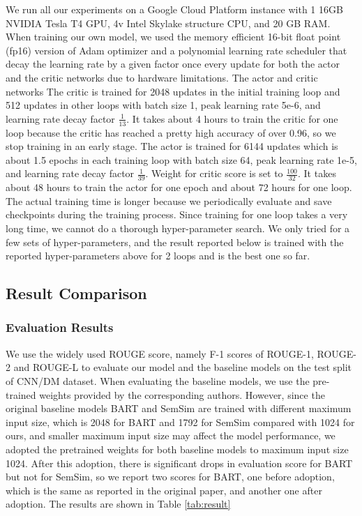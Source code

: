 \documentclass[11pt,a4paper]{article}
\begin{document}
We run all our experiments on a Google Cloud Platform instance with 1 16GB NVIDIA Tesla T4 GPU, 4v Intel Skylake structure CPU, and 20 GB RAM. When training our own model, we used the memory efficient 16-bit float point (fp16) version of Adam optimizer and a polynomial learning rate scheduler that decay the learning rate by a given factor once every update for both the actor and the critic networks due to hardware limitations. The actor and critic networks  The critic is trained for 2048 updates in the initial training loop and 512 updates in other loops with batch size 1, peak learning rate 5e-6, and learning rate decay factor $\frac{1}{13}$. It takes about 4 hours to train the critic for one loop because the critic has reached a pretty high accuracy of over 0.96, so we stop training in an early stage. The actor is trained for 6144 updates which is about 1.5 epochs in each training loop with batch size 64, peak learning rate 1e-5, and learning rate decay factor $\frac{1}{39}$. Weight for critic score is set to $\frac{100}{32}$. It takes about 48 hours to train the actor for one epoch and about 72 hours for one loop. The actual training time is longer because we periodically evaluate and save checkpoints during the training process. Since training for one loop takes a very long time, we cannot do a thorough hyper-parameter search. We only tried for a few sets of hyper-parameters, and the result reported below is trained with the reported hyper-parameters above for 2 loops and is the best one so far.


\subsection{Result Comparison}
\subsubsection{Evaluation Results}

We use the widely used ROUGE\cite{lin-2004-rouge} score, namely F-1 scores of ROUGE-1, ROUGE-2 and ROUGE-L \cite{paulus2017deep, see2017get, lewis2019bart} to evaluate our model and the baseline models on the test split of CNN/DM dataset. When evaluating the baseline models, we use the pre-trained weights provided by the corresponding authors. However, since the original baseline models BART and SemSim are trained with different maximum input size, which is 2048 for BART and 1792 for SemSim compared with 1024 for ours, and smaller maximum input size may affect the model performance, we adopted the pretrained weights for both baseline models to maximum input size 1024. After this adoption, there is significant drops in evaluation score for BART but not for SemSim, so we report two scores for BART, one before adoption, which is the same as reported in the original paper, and another one after adoption. The results are shown in Table \ref{tab:result}
\end{document}
